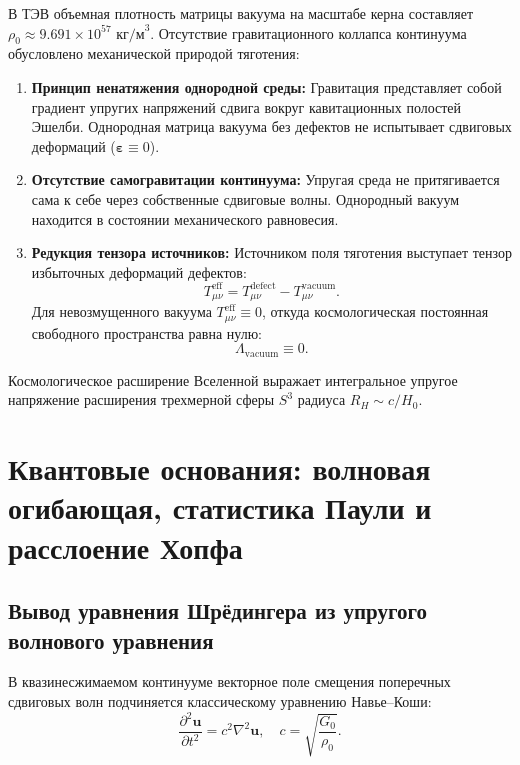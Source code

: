 \documentclass[11pt,a4paper]{article}
\theoremstyle{definition}
\theoremstyle{remark}
\begin{document}
В ТЭВ объемная плотность матрицы вакуума на масштабе керна составляет $\rho_0 \approx 9.691 \times 10^{57}\text{ кг/м}^3$. Отсутствие гравитационного коллапса континуума обусловлено механической природой тяготения:
\begin{enumerate}
	\item \textbf{Принцип ненатяжения однородной среды:} Гравитация представляет собой градиент упругих напряжений сдвига вокруг кавитационных полостей Эшелби. Однородная матрица вакуума без дефектов не испытывает сдвиговых деформаций ($\boldsymbol{\varepsilon} \equiv 0$).
	\item \textbf{Отсутствие самогравитации континуума:} Упругая среда не притягивается сама к себе через собственные сдвиговые волны. Однородный вакуум находится в состоянии механического равновесия.
	\item \textbf{Редукция тензора источников:} Источником поля тяготения выступает тензор избыточных деформаций дефектов:
\begin{equation}
	T_{\mu\nu}^{\mathrm{eff}} = T_{\mu\nu}^{\mathrm{defect}} - T_{\mu\nu}^{\mathrm{vacuum}}.
	\label{eq:effective_stress_tensor}
\end{equation}
Для невозмущенного вакуума $T_{\mu\nu}^{\mathrm{eff}} \equiv 0$, откуда космологическая постоянная свободного пространства равна нулю:
\begin{equation}
	\Lambda_{\mathrm{vacuum}} \equiv 0.
	\label{eq:lambda_vacuum_zero}
\end{equation}
\end{enumerate}
Космологическое расширение Вселенной выражает интегральное упругое напряжение расширения трехмерной сферы $S^3$ радиуса $R_H \sim c / H_0$.

\section{Квантовые основания: волновая огибающая, статистика Паули и расслоение Хопфа}

\subsection{Вывод уравнения Шрёдингера из упругого волнового уравнения}

В квазинесжимаемом континууме векторное поле смещения поперечных сдвиговых волн подчиняется классическому уравнению Навье--Коши:
\begin{equation}
	\frac{\partial^2 \mathbf{u}}{\partial t^2} = c^2 \nabla^2 \mathbf{u}, \quad c = \sqrt{\frac{G_0}{\rho_0}}.
	\label{eq:navier_cauchy_scalar}
\end{equation}
\end{document}

